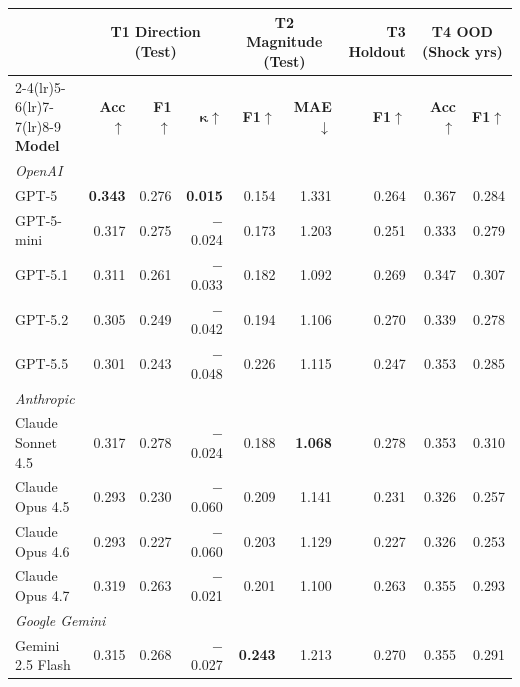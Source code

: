 \begin{table}[!t]
\centering\footnotesize
\setlength{\tabcolsep}{4pt}
\setlength{\fboxsep}{1.5pt} %
\begin{tabular}{@{}l rrr rr r rr@{}}
\toprule
 & \multicolumn{3}{c}{\textbf{T1 Direction (Test)}}
 & \multicolumn{2}{c}{\textbf{T2 Magnitude (Test)}}
 & \textbf{T3 Holdout}
 & \multicolumn{2}{c}{\textbf{T4 OOD (Shock yrs)}} \\
\cmidrule(lr){2-4}\cmidrule(lr){5-6}\cmidrule(lr){7-7}\cmidrule(lr){8-9}
\textbf{Model}
  & \textbf{Acc}$\uparrow$
  & \textbf{F1}$\uparrow$
  & $\boldsymbol{\kappa}\uparrow$
  & \textbf{F1}$\uparrow$
  & \textbf{MAE}$\downarrow$
  & \textbf{F1}$\uparrow$
  & \textbf{Acc}$\uparrow$
  & \textbf{F1}$\uparrow$ \\
\midrule
\multicolumn{9}{l}{\textit{OpenAI}} \\
GPT-5 & \colorbox{bestcell}{\textbf{0.343}} & 0.276 & \colorbox{bestcell}{\textbf{0.015}} & 0.154 & 1.331 & 0.264 & \colorbox{secondcell}{0.367} & 0.284 \\
GPT-5-mini & 0.317 & 0.275 & $-$0.024 & 0.173 & 1.203 & 0.251 & 0.333 & 0.279 \\
GPT-5.1 & 0.311 & 0.261 & $-$0.033 & 0.182 & 1.092 & 0.269 & 0.347 & 0.307 \\
GPT-5.2 & 0.305 & 0.249 & $-$0.042 & 0.194 & 1.106 & 0.270 & 0.339 & 0.278 \\
GPT-5.5 & 0.301 & 0.243 & $-$0.048 & 0.226 & 1.115 & 0.247 & 0.353 & 0.285 \\
\midrule
\multicolumn{9}{l}{\textit{Anthropic}} \\
Claude Sonnet 4.5 & 0.317 & 0.278 & $-$0.024 & 0.188 &  \colorbox{bestcell}{\textbf{1.068}} & 0.278 & 0.353 & 0.310 \\
Claude Opus 4.5 & 0.293 & 0.230 & $-$0.060 & 0.209 & 1.141 & 0.231 & 0.326 & 0.257 \\
Claude Opus 4.6 & 0.293 & 0.227 & $-$0.060 & 0.203 & 1.129 & 0.227 & 0.326 & 0.253 \\
Claude Opus 4.7 & 0.319 & 0.263 & $-$0.021 & 0.201 & 1.100 & 0.263 & 0.355 & 0.293 \\
\midrule
\multicolumn{9}{l}{\textit{Google Gemini}} \\
Gemini 2.5 Flash & 0.315 & 0.268 & $-$0.027 &  \colorbox{bestcell}{\textbf{0.243}}  & 1.213 & 0.270 & 0.355 & 0.291 \\

\end{tabular}
\end{table}
